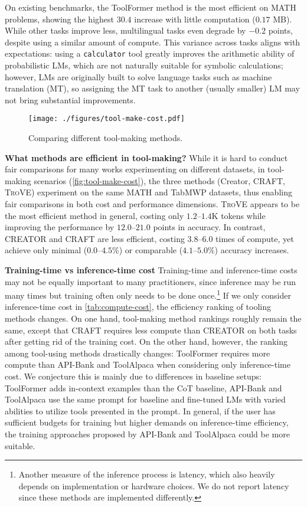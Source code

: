 On existing benchmarks, the ToolFormer method is the most efficient on MATH problems, showing the highest $30.4$ increase with little computation ($0.17$ MB). While other tasks improve less, multilingual tasks even degrade by $-0.2$ points, despite using a similar amount of compute. This variance across tasks aligns with expectations: using a \texttt{calculator} tool greatly improves the arithmetic ability of probabilistic LMs, which are not naturally suitable for symbolic calculations; however, LMs are originally built to solve language tasks such as machine translation (MT), so assigning the MT task to another (usually smaller) LM may not bring substantial improvements.


\begin{wrapfigure}[14]{r}{0.33\textwidth}
\vspace{-2mm}
\texttt{[image: ./figures/tool-make-cost.pdf]}
\vspace{-3mm}
\caption{Comparing different tool-making methods.}
\vspace{-1mm}
\label{fig:tool-make-cost}
\end{wrapfigure}
\noindent \textbf{What methods are efficient in tool-making?} \quad
While it is hard to conduct fair comparisons for many works experimenting on different datasets, in tool-making scenarios (\autoref{fig:tool-make-cost}), the three methods (Creator, CRAFT, \textsc{TroVE}) experiment on the same MATH and TabMWP datasets, thus enabling fair comparisons in both cost and performance dimensions.
\textsc{TroVE} appears to be the most efficient method in general, costing only $1.2$--$1.4$K tokens while improving the performance by $12.0$--$21.0$ points in accuracy. 
In contrast, CREATOR and CRAFT are less efficient, costing $3.8$--$6.0$ times of compute, yet achieve only minimal ($0.0$--$4.5$\%) or comparable ($4.1$--$5.0$\%) accuracy increases.


\noindent \textbf{Training-time vs inference-time cost} \quad
Training-time and inference-time costs may not be equally important to many practitioners, since inference may be run many times but training often only needs to be done once.\footnote{Another measure of the inference process is latency, which also heavily depends on implementation or hardware choices. We do not report latency since these methods are implemented differently.} If we only consider inference-time cost in \autoref{tab:compute-cost}, the efficiency ranking of tooling methods changes. On one hand, tool-making method rankings roughly remain the same, except that CRAFT requires less compute than CREATOR on both tasks after getting rid of the training cost.
On the other hand, however, the ranking among tool-using methods drastically changes: ToolFormer requires more compute than API-Bank and ToolAlpaca when considering only inference-time cost. We conjecture this is mainly due to differences in baseline setups: ToolFormer adds in-context examples than the CoT baseline, API-Bank and ToolAlpaca use the same prompt for baseline and fine-tuned LMs with varied abilities to utilize tools presented in the prompt.
In general, if the user has sufficient budgets for training but higher demands on inference-time efficiency, the training approaches proposed by API-Bank and ToolAlpaca could be more suitable.

